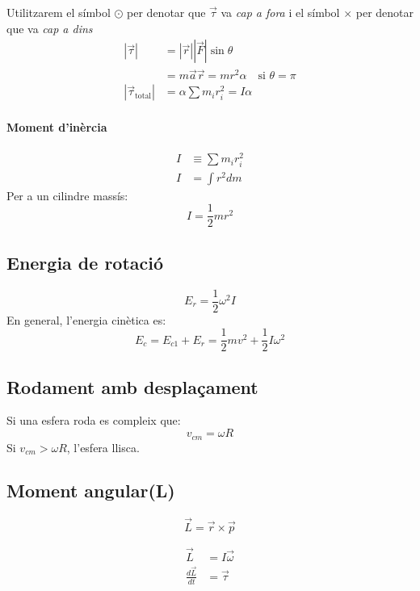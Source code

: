 Utilitzarem el símbol $\odot$ per denotar que $\vec{\tau}$ va \emph{cap a fora} i el símbol $\times$ per denotar que va \emph{cap a dins}
\begin{align}
    |\vec{\tau}| &= |\vec{r}||\vec{F}|\sin \theta \\
    &= m\vec{a}\vec{r} = m r^2 \alpha \quad \text{si $\theta = \pi$}\\
    |\vec{\tau}_\text{total}| &= \alpha \sum m_i r_i^2 = I\alpha
\end{align}

\paragraph{Moment d'inèrcia}
\begin{align}
    I &\equiv \sum m_i r_i^2 \\
    I &= \int r^2 dm
\end{align}
Per a un cilindre massís:
\begin{equation}
    I = \frac{1}{2}mr^2
\end{equation}

\subsection{Energia de rotació}
\begin{equation}
    E_r = \frac{1}{2}\omega^2I
\end{equation}
En general, l'energia cinètica es:
\begin{equation}
    E_c = E_{c1} + E_r = \frac{1}{2} m v^2 + \frac{1}{2}I\omega^2
\end{equation}

\subsection{Rodament amb desplaçament}
Si una esfera roda es compleix que:
\begin{equation}
    v_{cm} = \omega R
\end{equation}
Si $v_{cm} > \omega R$, l'esfera llisca.

\subsection{Moment angular(L)}
\begin{equation}
    \vec{L} = \vec{r} \times \vec{p}
\end{equation}

\begin{align}
    \vec{L} &= I \vec{\omega} \\
    \frac{d\vec{L}}{dt} &= \vec{\tau}
\end{align}


